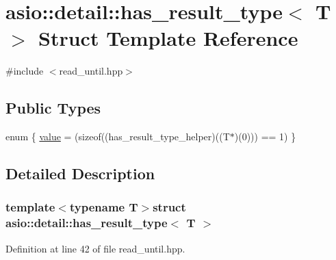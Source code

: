 \hypertarget{structasio_1_1detail_1_1has__result__type}{}\section{asio\+:\+:detail\+:\+:has\+\_\+result\+\_\+type$<$ T $>$ Struct Template Reference}
\label{structasio_1_1detail_1_1has__result__type}


{\ttfamily \#include $<$read\+\_\+until.\+hpp$>$}

\subsection*{Public Types}
\begin{DoxyCompactItemize}
\item 
enum \{ \hyperlink{structasio_1_1detail_1_1has__result__type_a23e57c0d4061f1da9c5947d355433ab7ab080d849fcb6f2a567e83684083ed8f2}{value} = (sizeof((has\+\_\+result\+\_\+type\+\_\+helper)((T$\ast$)(0))) == 1)
 \}
\end{DoxyCompactItemize}


\subsection{Detailed Description}
\subsubsection*{template$<$typename T$>$struct asio\+::detail\+::has\+\_\+result\+\_\+type$<$ T $>$}



Definition at line 42 of file read\+\_\+until.\+hpp.



